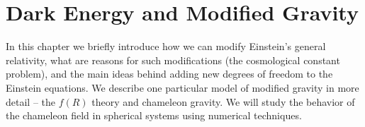 \chapter{Dark Energy and Modified Gravity}
\label{chpt:de_mg}
In this chapter we briefly introduce how we can modify Einstein's general relativity, what are reasons for such modifications (the cosmological constant problem), and the main ideas behind adding new degrees of freedom to the Einstein equations. We describe one particular model of modified gravity in more detail -- the $f(R)$ theory and chameleon gravity. We will study the behavior of the chameleon field in spherical systems using numerical techniques.







